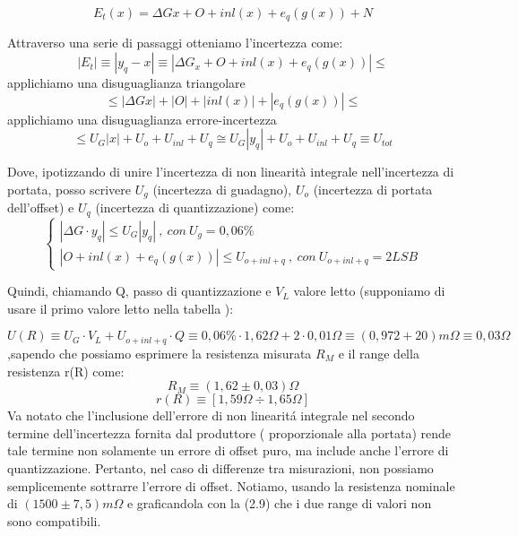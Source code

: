 \begin{equation}
    E_t(x) = \Delta Gx + O + inl(x) + e_q(g(x)) + N
\end{equation}


Attraverso una serie di passaggi otteniamo l'incertezza come:
\begin{equation}
    |E_t| \equiv |y_q - x| \equiv | \Delta G_x + O + inl(x) + e_q(g(x)) | \leq 
\end{equation}
applichiamo una disuguaglianza triangolare
\begin{equation*}
    \leq | \Delta Gx | + | O | + | inl(x) | + | e_q(g(x)) | \leq 
\end{equation*}
applichiamo una disuguaglianza errore-incertezza
\begin{equation*}
    \leq U_G|x| + U_o + U_{inl} + U_q \cong U_G|y_q| + U_o + U_{inl} +U_q \equiv U_{tot}
\end{equation*}

Dove, ipotizzando di unire l'incertezza di non linearità integrale nell'incertezza di portata, posso scrivere $U_g$ (incertezza di guadagno), $U_o$ (incertezza di portata dell'offset) e $U_q$ (incertezza di quantizzazione) come: 
\begin{equation}
\left\{\begin{array}{l}
    | \Delta G \cdot y_q | \leq U_G |y_q| \ , \ con \ U_g=0,06\% \\
| O + inl(x) + e_q(g(x)) | \leq U_{o+inl+q} \ , \ con \ U_{o+inl+q}=2LSB
\end{array}\right.
\end{equation}

Quindi, chiamando Q, passo di quantizzazione e $V_L$ valore letto (supponiamo di usare il primo valore letto nella tabella \label{mult_port}):

\begin{equation}
    U(R) \equiv U_G \cdot V_L + U_{o+inl+q} \cdot Q \equiv 0,06\% \cdot 1,62\Omega + 2 \cdot 0,01 \Omega \equiv (0,972 + 20) m\Omega \equiv 0,03 \Omega
\end{equation}
,sapendo che possiamo esprimere la resistenza misurata $R_M$ e il range della resistenza r(R) come:
\begin{equation}
    R_M \equiv(1,62 \pm 0,03) \Omega
\end{equation}
\begin{equation}
    r(R) \equiv [1,59 \Omega \div 1,65 \Omega]
\end{equation}
Va notato che l'inclusione dell'errore di non linearit\'a integrale nel secondo termine dell'incertezza fornita dal produttore ( proporzionale alla portata) rende tale termine non solamente un errore di offset puro, ma include anche l'errore di quantizzazione. Pertanto, nel caso di differenze tra misurazioni, non possiamo semplicemente sottrarre l'errore di offset.
Notiamo, usando la resistenza nominale di $(1500 \pm 7,5) m\Omega$ e graficandola con la (2.9) che i due range di valori non sono compatibili.

